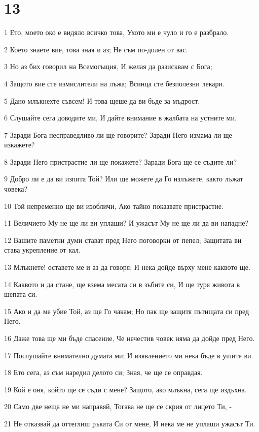 \chapter{13}

\par 1 Ето, моето око е видяло всичко това, Ухото ми е чуло и го е разбрало.
\par 2 Което знаете вие, това зная и аз; Не съм по-долен от вас.
\par 3 Но аз бих говорил на Всемогъщия, И желая да разисквам с Бога;
\par 4 Защото вие сте измислители на лъжа; Всинца сте безполезни лекари.
\par 5 Дано млъкнехте съвсем! И това щеше да ви бъде за мъдрост.
\par 6 Слушайте сега доводите ми, И дайте внимание в жалбата на устните ми.
\par 7 Заради Бога несправедливо ли ще говорите? Заради Него измама ли ще изкажете?
\par 8 Заради Него пристрастие ли ще покажете? Заради Бога ще се съдите ли?
\par 9 Добро ли е да ви изпита Той? Или ще можете да Го излъжете, както лъжат човека?
\par 10 Той непременно ще ви изобличи, Ако тайно показвате пристрастие.
\par 11 Величието Му не ще ли ви уплаши? И ужасът Му не ще ли да ви нападне?
\par 12 Вашите паметни думи стават пред Него поговорки от пепел; Защитата ви става укрепление от кал.
\par 13 Млъкнете! оставете ме и аз да говоря; И нека дойде върху мене каквото ще.
\par 14 Каквото и да стане, ще взема месата си в зъбите си, И ще туря живота в шепата си.
\par 15 Ако и да ме убие Той, аз ще Го чакам; Но пак ще защитя пътищата си пред Него.
\par 16 Даже това ще ми бъде спасение, Че нечестив човек няма да дойде пред Него.
\par 17 Послушайте внимателно думата ми; И изявлението ми нека бъде в ушите ви.
\par 18 Ето сега, аз съм наредил делото си; Зная, че ще се оправдая.
\par 19 Кой е оня, който ще се съди с мене? Защото, ако млъкна, сега ще издъхна.
\par 20 Само две неща не ми направяй, Тогава не ще се скрия от лицето Ти, -
\par 21 Не отказвай да оттеглиш ръката Си от мене, И нека ме не уплаши ужасът Ти.
